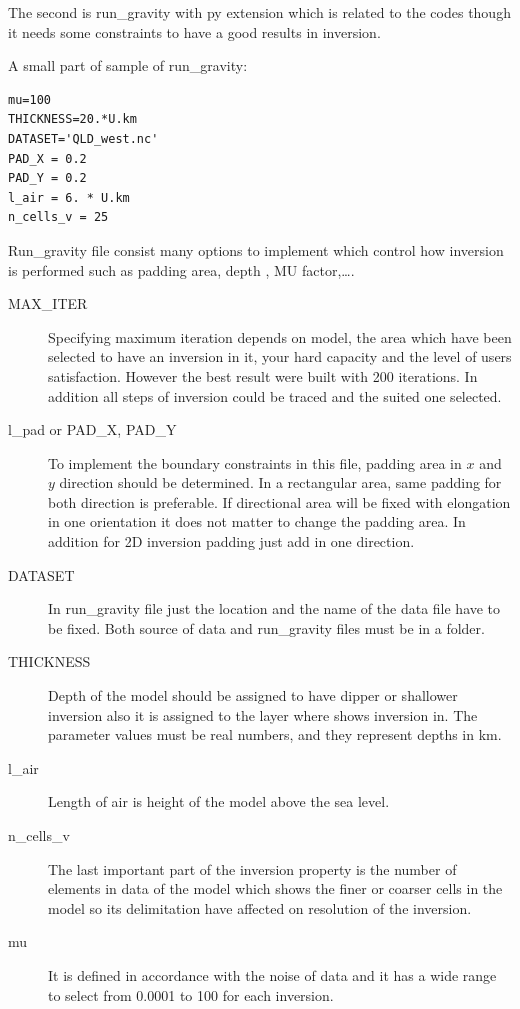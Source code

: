 The second is run_gravity with py extension which is related to the codes though 
it needs some constraints to have a good results in inversion.

A small part of sample of run_gravity:

\begin{verbatim}
mu=100
THICKNESS=20.*U.km
DATASET='QLD_west.nc'
PAD_X = 0.2
PAD_Y = 0.2
l_air = 6. * U.km
n_cells_v = 25
\end{verbatim}

Run_gravity file consist many options to implement which control how inversion is performed such as padding area, depth , MU factor,\ldots.

\begin{description} 	
\item[MAX\_ITER]
Specifying maximum iteration depends on model, the area which have been selected to have an inversion in it, your hard capacity and the level of users satisfaction. However the best result were built with 200 iterations. In addition all steps of inversion could be traced and the suited one selected.

\item[l_pad or PAD\_X, PAD\_Y] To implement the boundary constraints in this file, padding area in $x$ and $y$ direction should be determined. In a rectangular area, same padding for both direction is preferable. If directional area will be fixed with elongation in one orientation it does not matter to change the padding area. In addition for 2D inversion padding just add in one direction.

\item[DATASET] In run_gravity file just the location and the name of the data file have to be fixed. Both source of data and run_gravity files must be in a folder. 

\item[THICKNESS] Depth of the model should be assigned to have dipper or shallower inversion also it is assigned to the layer where shows inversion in. The parameter values must be real numbers, and they represent depths in km.

\item[l_air] Length of air is height of the model above the sea level. 

\item[n_cells_v] The last important part of the inversion property is the number of elements in data of the model which shows the finer or coarser cells in the model so its delimitation have affected on resolution of the inversion.

\item[mu]It is defined in accordance with the noise of data and it has a wide range to select from 0.0001 to 100 for each inversion.

\end{description}

